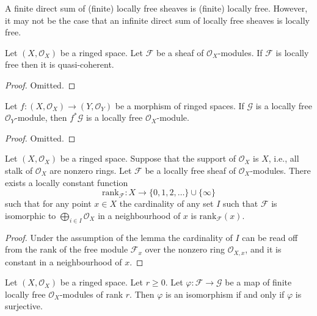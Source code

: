 \noindent
A finite direct sum of (finite) locally free sheaves is (finite)
locally free. However, it may not be the case that an infinite direct
sum of locally free sheaves is locally free.

\begin{lemma}
\label{lemma-locally-free-quasi-coherent}
Let $(X, \mathcal{O}_X)$ be a ringed space.
Let $\mathcal{F}$ be a sheaf of $\mathcal{O}_X$-modules.
If $\mathcal{F}$ is locally free then it is quasi-coherent.
\end{lemma}

\begin{proof}
Omitted.
\end{proof}

\begin{lemma}
\label{lemma-pullback-locally-free}
Let $f : (X, \mathcal{O}_X) \to (Y, \mathcal{O}_Y)$
be a morphism of ringed spaces. If $\mathcal{G}$ is
a locally free $\mathcal{O}_Y$-module, then
$f^*\mathcal{G}$ is a locally free $\mathcal{O}_X$-module.
\end{lemma}

\begin{proof}
Omitted.
\end{proof}

\begin{lemma}
\label{lemma-rank}
Let $(X, \mathcal{O}_X)$ be a ringed space.
Suppose that the support of $\mathcal{O}_X$ is $X$,
i.e., all stalk of $\mathcal{O}_X$ are nonzero rings.
Let $\mathcal{F}$ be a locally free sheaf of $\mathcal{O}_X$-modules.
There exists a locally constant function
$$
\text{rank}_\mathcal{F} :
X \longrightarrow \{0, 1, 2, \ldots\}\cup\{\infty\}
$$
such that for any point $x \in X$ the cardinality of any
set $I$ such that $\mathcal{F}$ is isomorphic to
$\bigoplus_{i\in I} \mathcal{O}_X$ in a neighbourhood
of $x$ is $\text{rank}_\mathcal{F}(x)$.
\end{lemma}

\begin{proof}
Under the assumption of the lemma the cardinality of $I$ can be read off
from the rank of the free module $\mathcal{F}_x$ over the nonzero ring
$\mathcal{O}_{X, x}$, and it is constant in a neighbourhood of $x$.
\end{proof}

\begin{lemma}
\label{lemma-map-finite-locally-free}
Let $(X, \mathcal{O}_X)$ be a ringed space. Let $r \geq 0$.
Let $\varphi : \mathcal{F} \to \mathcal{G}$ be a map of finite
locally free $\mathcal{O}_X$-modules of rank $r$.
Then $\varphi$ is an isomorphism if and only if $\varphi$
is surjective.
\end{lemma}

